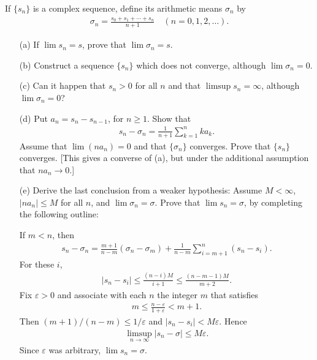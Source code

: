   \begin{exercise}[Rudin 3.14]
    If $\{s_n\}$ is a complex sequence, define its arithmetic means $\sigma_n$ by
    \begin{align*}
      \sigma_n = \frac{s_0 + s_1 + \cdots + s_n}{n+1} \quad (n = 0, 1, 2, \ldots).
    \end{align*}
    \begin{enumerate} 
      \item[(a)] If $\lim s_n = s$, prove that $\lim \sigma_n = s$.
      \item[(b)] Construct a sequence $\{s_n\}$ which does not converge, although $\lim \sigma_n = 0$.
      \item[(c)] Can it happen that $s_n > 0$ for all $n$ and that $\limsup s_n = \infty$, although $\lim \sigma_n = 0$?
      \item[(d)] Put $a_n = s_n - s_{n-1}$, for $n \geq 1$. Show that
      \begin{align*}
        s_n - \sigma_n = \frac{1}{n+1} \sum_{k=1}^{n} ka_k.
      \end{align*}
      Assume that $\lim (na_n) = 0$ and that $\{\sigma_n\}$ converges. Prove that $\{s_n\}$ converges. [This gives a converse of (a), but under the additional assumption that $na_n \to 0$.]
      \item[(e)] Derive the last conclusion from a weaker hypothesis: Assume $M < \infty$, $|na_n| \leq M$ for all $n$, and $\lim \sigma_n = \sigma$. Prove that $\lim s_n = \sigma$, by completing the following outline:
      
      If $m < n$, then
      \begin{align*}
        s_n - \sigma_n = \frac{m+1}{n-m}(\sigma_n - \sigma_m) + \frac{1}{n-m} \sum_{i=m+1}^{n} (s_n - s_i).
      \end{align*}
      For these $i$,
      \begin{align*}
        |s_n - s_i| \leq \frac{(n-i)M}{i+1} \leq \frac{(n-m-1)M}{m+2}.
      \end{align*}
      Fix $\varepsilon > 0$ and associate with each $n$ the integer $m$ that satisfies
      \begin{align*}
        m \leq \frac{n-\varepsilon}{1+\varepsilon} < m+1.
      \end{align*}
      Then $(m+1)/(n-m) \leq 1/\varepsilon$ and $|s_n - s_i| < M\varepsilon$. Hence
      \begin{align*}
        \limsup_{n \to \infty} |s_n - \sigma| \leq M\varepsilon.
      \end{align*}
      Since $\varepsilon$ was arbitrary, $\lim s_n = \sigma$.
    \end{enumerate}
  \end{exercise}
  \begin{solution}
    
  \end{solution}

